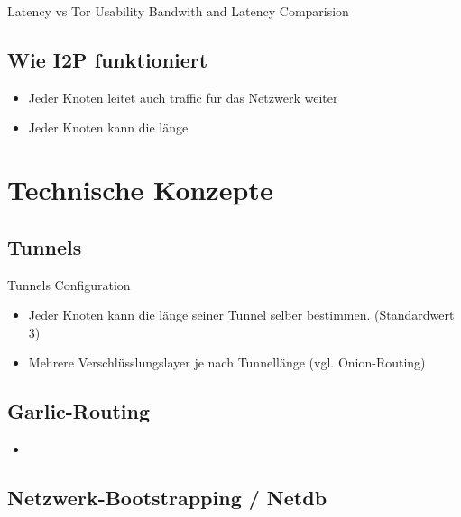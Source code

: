 \cite{hoang_measuring_2019}
\cite{hoang_empirical_2018}

\cite{de_boer_invisible_2019}

\cite{zantout_i2p_2011}

Latency vs Tor Usability Bandwith and Latency Comparision
\cite{ehlert_i2p_2021}

\subsection{Wie I2P funktioniert}

\begin{itemize}
    \item Jeder Knoten leitet auch traffic für das Netzwerk weiter
    \item Jeder Knoten kann die länge 
\end{itemize}

\section{Technische Konzepte}
\label{sec:technischeKonzepte}

\subsection{Tunnels}

Tunnels Configuration
\cite{noauthor_i2p_nodate-3}

\begin{itemize}
    \item Jeder Knoten kann die länge seiner Tunnel selber bestimmen. (Standardwert 3)
    \item Mehrere Verschlüsslungslayer je nach Tunnellänge (vgl. Onion-Routing)
\end{itemize}

\subsection{Garlic-Routing}

\begin{itemize}
    \item
\end{itemize}

\subsection{Netzwerk-Bootstrapping / Netdb}

